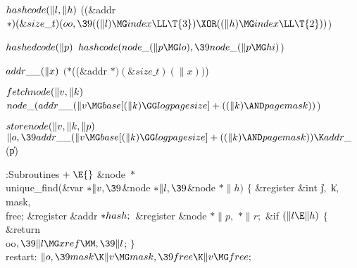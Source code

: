 \Y\B\4\D$\\{hashcode}(\|l,\|h)$ \5
((\&{addr} ${}{*})(\&{size\_t})(\\{oo},\39((\|l)\MG\\{index}\LL\T{3})\XOR((\|h)%
\MG\\{index}\LL\T{2})){}$)\par
\B\4\D$\\{hashedcode}(\|p)$ \5
$\\{hashcode}(\\{node\_}(\|p\MG\\{lo}),\39\\{node\_}(\|p\MG\\{hi}){}$)\par
\B\4\D$\\{addr\_\_}(\|x)$ \5
$({*}{}$((\&{addr} ${}{*})(\&{size\_t})(\|x)){}$)\par
\B\4\D$\\{fetchnode}(\|v,\|k)$ \5
$\\{node\_}(\\{addr\_\_}(\|v\MG\\{base}[(\|k)\GG\\{logpagesize}]+((\|k)\AND%
\\{pagemask})){}$)\par
\B\4\D$\\{storenode}(\|v,\|k,\|p)$ \5
$\|o,\39\\{addr\_\_}(\|v\MG\\{base}[(\|k)\GG\\{logpagesize}]+((\|k)\AND%
\\{pagemask}))\K\\{addr\_}{}$(\|p)\par
\Y\B\4:Subroutines\X${}\mathrel+\E{}$\6
\&{node} ${}{*}{}$\\{unique\_find}(\&{var} ${}{*}\|v,\39{}$\&{node} ${}{*}\|l,%
\39{}$\&{node} ${}{*}\|h){}$\1\1\2\2\6
${}\{{}$\1\6
\&{register} \&{int} \|j${},{}$ \|k${},{}$ \\{mask}${},{}$ \\{free};\6
\&{register} \&{addr} ${}{*}\\{hash};{}$\6
\&{register} \&{node} ${}{*}\|p,{}$ ${}{*}\|r;{}$\7
\&{if} ${}(\|l\E\|h){}$\5
${}\{{}$\1\6
\&{return} \\{oo}${},\39\|l\MG\\{xref}\MM,\39\|l{}$;\6
\4${}\}{}$\2\6
\4\\{restart}:\5
${}\|o,\39\\{mask}\K\|v\MG\\{mask},\39\\{free}\K\|v\MG\\{free};{}$\6
